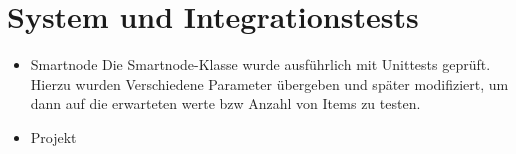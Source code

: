 \chapter{System und Integrationstests}
\begin{itemize}
\item Smartnode \newline
Die Smartnode-Klasse wurde ausführlich mit Unittests geprüft. Hierzu wurden Verschiedene Parameter übergeben und später modifiziert, um dann auf die erwarteten werte bzw Anzahl von Items zu testen.
\item Projekt \newline

\end{itemize}